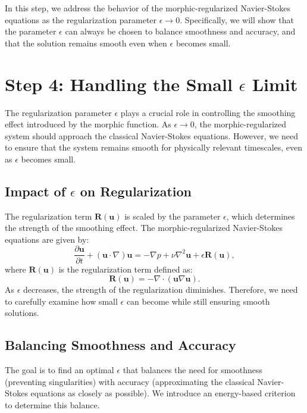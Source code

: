\documentclass{article}
\begin{document}
In this step, we address the behavior of the morphic-regularized Navier-Stokes equations as the regularization parameter \( \epsilon \to 0 \). Specifically, we will show that the parameter \( \epsilon \) can always be chosen to balance smoothness and accuracy, and that the solution remains smooth even when \( \epsilon \) becomes small.

\section{Step 4: Handling the Small \( \epsilon \) Limit}

The regularization parameter \( \epsilon \) plays a crucial role in controlling the smoothing effect introduced by the morphic function. As \( \epsilon \to 0 \), the morphic-regularized system should approach the classical Navier-Stokes equations. However, we need to ensure that the system remains smooth for physically relevant timescales, even as \( \epsilon \) becomes small.

\subsection*{Impact of \( \epsilon \) on Regularization}

The regularization term \( \mathbf{R}(\mathbf{u}) \) is scaled by the parameter \( \epsilon \), which determines the strength of the smoothing effect. The morphic-regularized Navier-Stokes equations are given by:
\[
\frac{\partial \mathbf{u}}{\partial t} + (\mathbf{u} \cdot \nabla) \mathbf{u} = -\nabla p + \nu \nabla^2 \mathbf{u} + \epsilon \mathbf{R}(\mathbf{u}),
\]
where \( \mathbf{R}(\mathbf{u}) \) is the regularization term defined as:
\[
\mathbf{R}(\mathbf{u}) = -\nabla \cdot (\mathbf{u} \nabla \mathbf{u}).
\]
As \( \epsilon \) decreases, the strength of the regularization diminishes. Therefore, we need to carefully examine how small \( \epsilon \) can become while still ensuring smooth solutions.

\subsection*{Balancing Smoothness and Accuracy}

The goal is to find an optimal \( \epsilon \) that balances the need for smoothness (preventing singularities) with accuracy (approximating the classical Navier-Stokes equations as closely as possible). We introduce an energy-based criterion to determine this balance.
\end{document}
